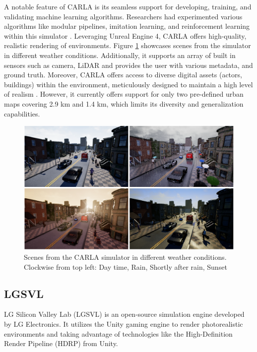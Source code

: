 \documentclass[12pt,twoside,a4paper,parskip]{scrbook} %
\begin{document}
A notable feature of CARLA is its seamless support for developing, training, and validating machine learning algorithms. Researchers had experimented various algorithms like modular pipelines, imitation learning, and reinforcement learning within this simulator \cite{Carla}. Leveraging Unreal Engine 4, CARLA offers high-quality, realistic rendering of environments. Figure \ref{fig:CARLA} \cite{Carla} showcases scenes from the simulator in different weather conditions. Additionally, it supports an array of built in sensors such as camera, LiDAR and provides the user with various metadata, and ground truth. Moreover, CARLA offers access to diverse digital assets (actors, buildings) within the environment, meticulously designed to maintain a high level of realism \cite{Carla}. However, it currently offers support for only two pre-defined urban maps covering 2.9 km and 1.4 km, which limits its diversity and generalization capabilities.

\begin{figure}[h]
    \centering
    \includegraphics[width=1.0\textwidth]{Images/CARLA_allweather.png}
    \caption[Scenes from the CARLA simulator in different weather conditions]{Scenes from the CARLA simulator in different weather conditions. Clockwise from top left: Day time, Rain, Shortly after rain, Sunset}
    \label{fig:CARLA}
  \end{figure}
\subsection{LGSVL}
LG Silicon Valley Lab (LGSVL) is an open-source simulation engine developed by LG Electronics. It utilizes the Unity gaming engine to render photorealistic environments and taking advantage of technologies like the High-Definition Render Pipeline (HDRP) from Unity. 
\end{document}
